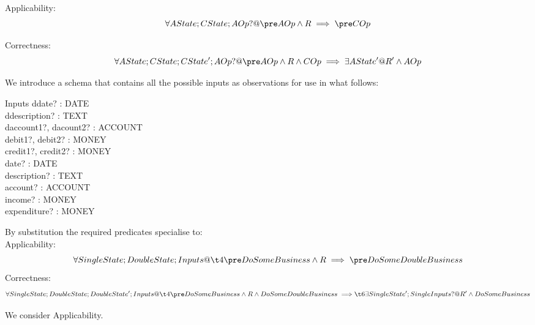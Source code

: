 \documentclass[11pt]{amsart}
\begin{document}
\noindent Applicability:
\[
\forall AState; CState; AOp? @ \pre AOp \land R \implies \pre COp
\]

\noindent Correctness:
\[
\forall AState; CState; CState'; AOp? @ \pre AOp \land R \land COp \implies \exists AState' @ R' \land AOp
\]

We introduce a schema that contains all the possible inputs as observations for use in what follows:

\begin{schema}{Inputs}
ddate? : DATE\\
ddescription? : TEXT\\
daccount1?, dacount2? : ACCOUNT\\ 
debit1?, debit2? : MONEY\\
credit1?, credit2? : MONEY\\
date? : DATE\\
description? : TEXT\\
account? : ACCOUNT\\ 
income? : MONEY\\
expenditure? : MONEY
\end{schema}


By substitution the required predicates specialise to:\\

\noindent Applicability:
\[
\forall SingleState; DoubleState; Inputs @\\
\t4 \pre DoSomeBusiness \land R \implies \pre DoSomeDoubleBusiness
\]
\noindent Correctness:
\[
\forall SingleState; DoubleState; DoubleState'; Inputs @\\
\t4  \pre DoSomeBusiness \land R \land DoSomeDoubleBusiness \implies \\
\t6 \exists SingleState'; SingleInputs?  @ R' \land DoSomeBusiness
\]

We consider Applicability.
\end{document}
